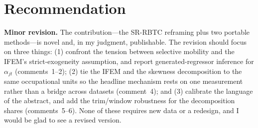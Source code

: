 \documentclass[11pt]{article}
\begin{document}
\section*{Recommendation}

\textbf{Minor revision.} The contribution---the SR-RBTC reframing plus two portable
methods---is novel and, in my judgment, publishable. The revision should focus on three things:
(1) confront the tension between selective mobility and the IFEM's strict-exogeneity assumption, and
report generated-regressor inference for $\alpha_{jt}$ (comments~1--2); (2) tie the IFEM and the
skewness decomposition to the same occupational units so the headline mechanism rests on one
measurement rather than a bridge across datasets (comment~4); and (3) calibrate the language of the
abstract, and add the trim/window robustness for the decomposition shares (comments~5--6). None of
these requires new data or a redesign, and I would be glad to see a revised version.
\end{document}
